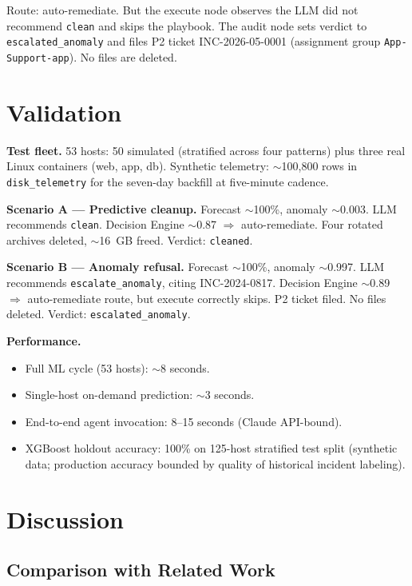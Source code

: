 \documentclass[conference]{IEEEtran}
\begin{document}
Route: auto-remediate. But the execute node observes the LLM did not
recommend \texttt{clean} and skips the playbook. The audit node sets
verdict to \texttt{escalated\_anomaly} and files P2 ticket
INC-2026-05-0001 (assignment group \texttt{App-Support-app}). No
files are deleted.

\section{Validation}
\label{sec:validation}

\textbf{Test fleet.} 53 hosts: 50 simulated (stratified across four
patterns) plus three real Linux containers (web, app, db). Synthetic
telemetry: $\sim$100{,}800 rows in \texttt{disk\_telemetry} for the
seven-day backfill at five-minute cadence.

\textbf{Scenario A --- Predictive cleanup.} Forecast $\sim$100\%,
anomaly $\sim$0.003. LLM recommends \texttt{clean}. Decision Engine
$\sim$0.87 $\Rightarrow$ auto-remediate. Four rotated archives
deleted, $\sim$16~GB freed. Verdict: \texttt{cleaned}.

\textbf{Scenario B --- Anomaly refusal.} Forecast $\sim$100\%,
anomaly $\sim$0.997. LLM recommends \texttt{escalate\_anomaly},
citing INC-2024-0817. Decision Engine $\sim$0.89 $\Rightarrow$
auto-remediate route, but execute correctly skips. P2 ticket filed.
No files deleted. Verdict: \texttt{escalated\_anomaly}.

\textbf{Performance.}
\begin{itemize}
\item Full ML cycle (53 hosts): $\sim$8 seconds.
\item Single-host on-demand prediction: $\sim$3 seconds.
\item End-to-end agent invocation: 8--15 seconds (Claude API-bound).
\item XGBoost holdout accuracy: 100\% on 125-host stratified test
  split (synthetic data; production accuracy bounded by quality of
  historical incident labeling).
\end{itemize}

\section{Discussion}
\label{sec:discussion}

\subsection{Comparison with Related Work}
\end{document}
